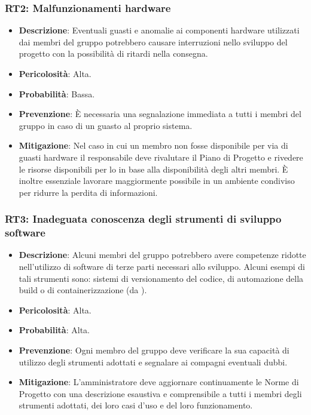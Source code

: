 \subsubsection{RT2: Malfunzionamenti hardware}
\begin{itemize}
    \item \textbf{Descrizione}: Eventuali guasti e anomalie ai componenti hardware utilizzati dai membri del gruppo potrebbero causare 
    interruzioni nello sviluppo del progetto con la possibilità di ritardi nella consegna.
    \item \textbf{Pericolosità}: Alta.
    \item \textbf{Probabilità}: Bassa.
    \item \textbf{Prevenzione}: È necessaria una segnalazione immediata a tutti i membri del gruppo in caso di un guasto al proprio sistema.
    \item \textbf{Mitigazione}: Nel caso in cui un membro non fosse disponibile per via di guasti hardware il responsabile deve  rivalutare il Piano di Progetto e rivedere le risorse disponibili per lo  in base alla disponibilità degli altri membri.
    È inoltre essenziale lavorare maggiormente possibile in un ambiente condiviso per ridurre la perdita di informazioni.
\end{itemize}

\subsubsection{RT3: Inadeguata conoscenza degli strumenti di sviluppo software}
\begin{itemize}
    \item \textbf{Descrizione}: Alcuni membri del gruppo potrebbero avere competenze ridotte nell'utilizzo di software di terze parti necessari allo sviluppo.
    Alcuni esempi di tali strumenti sono: sistemi di versionamento del codice, di automazione della build o di containerizzazione (da ). 
    \item \textbf{Pericolosità}: Alta.
    \item \textbf{Probabilità}: Alta.
    \item \textbf{Prevenzione}: Ogni membro del gruppo deve verificare la sua capacità di utilizzo degli strumenti adottati e segnalare ai compagni eventuali dubbi.
    \item \textbf{Mitigazione}: L'amministratore deve aggiornare continuamente le Norme di Progetto con una descrizione esaustiva e comprensibile a tutti i membri degli strumenti adottati, dei loro casi d'uso e del loro funzionamento.
\end{itemize}

